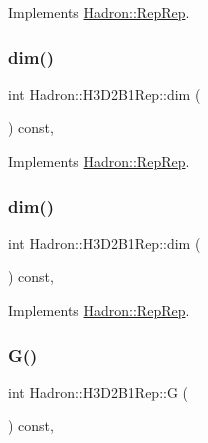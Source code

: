 Implements \mbox{\hyperlink{structHadron_1_1RepRep_a92c8802e5ed7afd7da43ccfd5b7cd92b}{Hadron\+::\+Rep\+Rep}}.

\mbox{\label{structHadron_1_1H3D2B1Rep_a6330bd40d22d4580286ffabbcf9f3c7d}} 
\subsubsection{\texorpdfstring{dim()}{dim()}\hspace{0.1cm}{\footnotesize\ttfamily [2/3]}}
{\footnotesize\ttfamily int Hadron\+::\+H3\+D2\+B1\+Rep\+::dim (\begin{DoxyParamCaption}{ }\end{DoxyParamCaption}) const\hspace{0.3cm}{\ttfamily [inline]}, {\ttfamily [virtual]}}



Implements \mbox{\hyperlink{structHadron_1_1RepRep_a92c8802e5ed7afd7da43ccfd5b7cd92b}{Hadron\+::\+Rep\+Rep}}.

\mbox{\label{structHadron_1_1H3D2B1Rep_a6330bd40d22d4580286ffabbcf9f3c7d}} 
\subsubsection{\texorpdfstring{dim()}{dim()}\hspace{0.1cm}{\footnotesize\ttfamily [3/3]}}
{\footnotesize\ttfamily int Hadron\+::\+H3\+D2\+B1\+Rep\+::dim (\begin{DoxyParamCaption}{ }\end{DoxyParamCaption}) const\hspace{0.3cm}{\ttfamily [inline]}, {\ttfamily [virtual]}}



Implements \mbox{\hyperlink{structHadron_1_1RepRep_a92c8802e5ed7afd7da43ccfd5b7cd92b}{Hadron\+::\+Rep\+Rep}}.

\mbox{\label{structHadron_1_1H3D2B1Rep_a7870acf492c1acb514530f17633f7f6d}} 
\subsubsection{\texorpdfstring{G()}{G()}\hspace{0.1cm}{\footnotesize\ttfamily [1/2]}}
{\footnotesize\ttfamily int Hadron\+::\+H3\+D2\+B1\+Rep\+::G (\begin{DoxyParamCaption}{ }\end{DoxyParamCaption}) const\hspace{0.3cm}{\ttfamily [inline]}, {\ttfamily [virtual]}}

